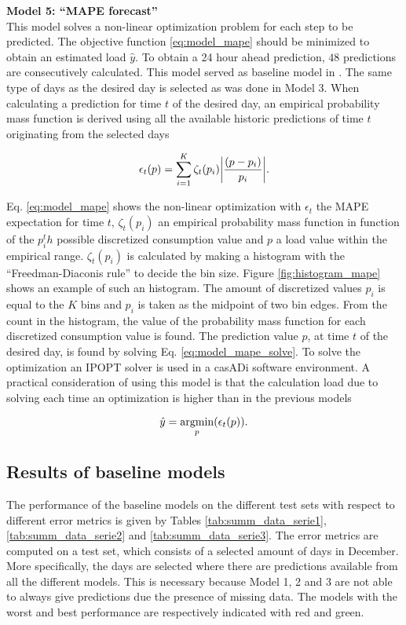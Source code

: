 \textbf{Model 5: ``MAPE forecast'' }\\
 This model solves a non-linear optimization problem for each step to be predicted. The objective function \ref{eq:model_mape} should be minimized to obtain an estimated load $ \hat{y} $. To obtain a 24 hour ahead prediction, $ 48  $ predictions are consecutively calculated. This model served as baseline model in \cite{Kong2019}. The same type of days as the desired day is selected as was done in Model 3. When calculating a prediction for time $ t $ of the desired day, an empirical probability mass function is derived using all the available historic predictions of time $ t $ originating from the selected days
 
 \begin{equation}\label{eq:model_mape} 	
 	\epsilon_{t}(p) = \sum_{i=1}^K \zeta_{t}(p_i)\abs{\frac{(p-p_{i})}{p_{i}}}.
 \end{equation}

Eq. \ref{eq:model_mape} shows the non-linear optimization with $ \epsilon_{t} $ the MAPE expectation for time $ t $, $\zeta_{t}(p_i)$ an empirical probability mass function in function of the $ p_i^th$ possible discretized consumption value and $ p $ a load value within the empirical range. $ \zeta_{t}(p_i) $ is calculated by making a histogram with the ``Freedman-Diaconis rule'' to decide the bin size. Figure \ref{fig:histogram_mape} shows an example of such an histogram. The amount of discretized values $ p_i $ is equal to the $ K $ bins and $ p_i $ is taken as the midpoint of two bin edges. From the count in the histogram, the value of the probability mass function for each discretized consumption value is found. The prediction value $ p $, at time $ t $ of the desired day, is found by solving Eq. \ref{eq:model_mape_solve}. To solve the optimization an IPOPT solver is used in a casADi software environment. A practical consideration of using this model is that the calculation load due to solving each time an optimization is higher than in the previous models

\begin{equation}\label{eq:model_mape_solve} 	
	\hat{y} = \operatorname*{argmin}_{p}(\epsilon_{t}(p)).
\end{equation}
 
 
\subsection{Results of baseline models}
The performance of the baseline models on the different test sets with respect to different error metrics is given by Tables \ref{tab:summ_data_serie1}, \ref{tab:summ_data_serie2} and \ref{tab:summ_data_serie3}. The error metrics are computed on a test set, which consists of a selected amount of days in December. More specifically, the days are selected where there are predictions available from all the different models. This is necessary because Model 1, 2 and 3 are not able to always give predictions due the presence of missing data. The models with the worst and best performance are respectively indicated with red and green.  

